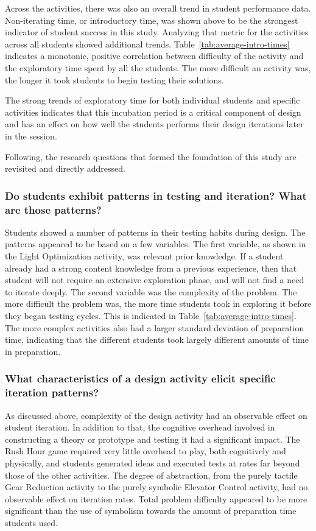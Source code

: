 Across the activities, there was also an overall trend in student performance data. Non-iterating time, or introductory time, was shown above to be the strongest indicator of student success in this study. Analyzing that metric for the activities across all students showed additional trends. Table~\ref{tab:average-intro-times} indicates a monotonic, positive correlation between difficulty of the activity and the exploratory time spent by all the students. The more difficult an activity was, the longer it took students to begin testing their solutions. 

The strong trends of exploratory time for both individual students and specific activities indicates that this incubation period is a critical component of design and has an effect on how well the students performs their design iterations later in the session.

Following, the research questions that formed the foundation of this study are revisited and directly addressed.

\subsubsection{Do students exhibit patterns in testing and iteration? What are those patterns?}
	Students showed a number of patterns in their testing habits during design. The patterns appeared to be based on a few variables. The first variable, as shown in the Light Optimization activity, was relevant prior knowledge. If a student already had a strong content knowledge from a previous experience, then that student will not require an extensive exploration phase, and will not find a need to iterate deeply. The second variable was the complexity of the problem. The more difficult the problem was, the more time students took in exploring it before they began testing cycles. This is indicated in Table~\ref{tab:average-intro-times}. The more complex activities also had a larger standard deviation of preparation time, indicating that the different students took largely different amounts of time in preparation.
	
\subsubsection{What characteristics of a design activity elicit specific iteration patterns?}
	As discussed above, complexity of the design activity had an observable effect on student iteration. In addition to that, the cognitive overhead involved in constructing a theory or prototype and testing it had a significant impact. The Rush Hour game required very little overhead to play, both cognitively and physically, and students generated ideas and executed tests at rates far beyond those of the other activities. The degree of abstraction, from the purely tactile Gear Reduction activity to the purely symbolic Elevator Control activity, had no observable effect on iteration rates. Total problem difficulty appeared to be more significant than the use of symbolism towards the amount of preparation time students used. 
	
